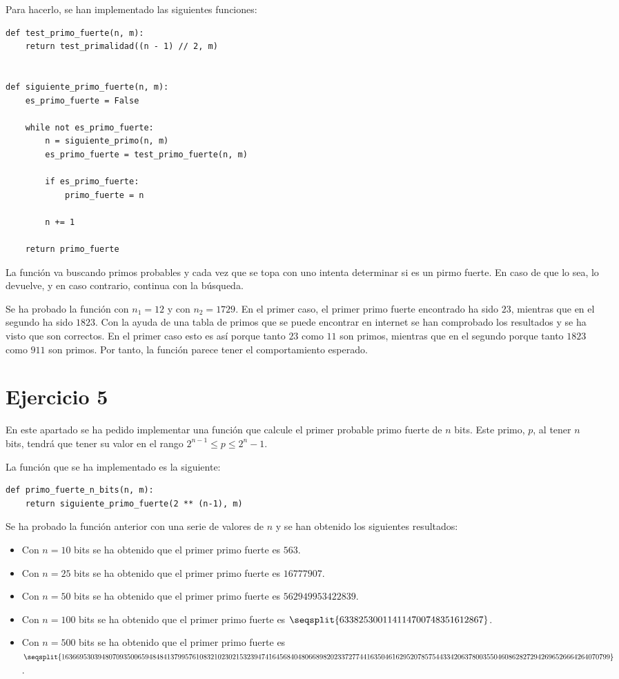\documentclass[11pt,a4paper]{article}
\newcommand{\nonumsection}[1]{\section*{#1}\addcontentsline{toc}{section}{#1}}
\begin{document}
Para hacerlo, se han implementado las siguientes funciones:

\begin{lstlisting}
def test_primo_fuerte(n, m):
    return test_primalidad((n - 1) // 2, m)


def siguiente_primo_fuerte(n, m):
    es_primo_fuerte = False

    while not es_primo_fuerte:
        n = siguiente_primo(n, m)
        es_primo_fuerte = test_primo_fuerte(n, m)

        if es_primo_fuerte:
            primo_fuerte = n
        
        n += 1
    
    return primo_fuerte
\end{lstlisting}

La función va buscando primos probables y cada vez que se topa con uno intenta determinar
si es un pirmo fuerte. En caso de que lo sea, lo devuelve, y en caso contrario, continua
con la búsqueda.

Se ha probado la función con $n_1 = 12$ y con $n_2 = 1729$. En el primer caso, el primer
primo fuerte encontrado ha sido $23$, mientras que en el segundo ha sido $1823$. Con la ayuda
de una tabla de primos que se puede encontrar en internet se han comprobado los resultados y
se ha visto que son correctos. En el primer caso esto es así porque tanto $23$ como $11$ son
primos, mientras que en el segundo porque tanto $1823$ como $911$ son primos. Por tanto, la
función parece tener el comportamiento esperado.

\nonumsection{Ejercicio 5}

En este apartado se ha pedido implementar una función que calcule el primer probable primo
fuerte de $n$ bits. Este primo, $p$, al tener $n$ bits, tendrá que tener su valor
en el rango $2^{n-1} \leq p \leq 2^n - 1$.

La función que se ha implementado es la siguiente:

\begin{lstlisting}
def primo_fuerte_n_bits(n, m):
    return siguiente_primo_fuerte(2 ** (n-1), m)
\end{lstlisting}

Se ha probado la función anterior con una serie de valores de $n$ y se han obtenido los
siguientes resultados:

\begin{itemize}
	\item Con $n = 10$ bits se ha obtenido que el primer primo fuerte es $563$.
	\item Con $n = 25$ bits se ha obtenido que el primer primo fuerte es $16777907$.
	\item Con $n = 50$ bits se ha obtenido que el primer primo fuerte es $562949953422839$.
	\item Con $n = 100$ bits se ha obtenido que el primer primo fuerte es
	$\seqsplit{633825300114114700748351612867}$.
	\item Con $n = 500$ bits se ha obtenido que el primer primo fuerte es
	$\seqsplit{1636695303948070935006594848413799576108321023021532394741645684048066898202337277441635046162952078575443342063780035504608628272942696526664264070799}$.
\end{itemize}
\end{document}
